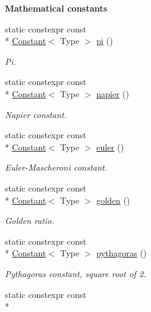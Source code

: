 \begin{Indent}{\bf Mathematical constants}\par
\begin{DoxyCompactItemize}
\item 
static constexpr const \\*
\hyperlink{exceptionmagrathea_1_1Constant}{Constant}$<$ Type $>$ \hyperlink{exceptionmagrathea_1_1Constants_a79171138d1fe0b3e70fedd56d464fdd6}{pi} ()
\begin{DoxyCompactList}\small\item\em Pi. \end{DoxyCompactList}\item 
static constexpr const \\*
\hyperlink{exceptionmagrathea_1_1Constant}{Constant}$<$ Type $>$ \hyperlink{exceptionmagrathea_1_1Constants_a54534097495fc563b9f8627dfc9020c8}{napier} ()
\begin{DoxyCompactList}\small\item\em Napier constant. \end{DoxyCompactList}\item 
static constexpr const \\*
\hyperlink{exceptionmagrathea_1_1Constant}{Constant}$<$ Type $>$ \hyperlink{exceptionmagrathea_1_1Constants_a9f9734b514d0fca8aa5c4bd4c1f5c98a}{euler} ()
\begin{DoxyCompactList}\small\item\em Euler-\/\-Mascheroni constant. \end{DoxyCompactList}\item 
static constexpr const \\*
\hyperlink{exceptionmagrathea_1_1Constant}{Constant}$<$ Type $>$ \hyperlink{exceptionmagrathea_1_1Constants_aff8c9ebdef8d923a9b4130fdf1c8a604}{golden} ()
\begin{DoxyCompactList}\small\item\em Golden ratio. \end{DoxyCompactList}\item 
static constexpr const \\*
\hyperlink{exceptionmagrathea_1_1Constant}{Constant}$<$ Type $>$ \hyperlink{exceptionmagrathea_1_1Constants_a2ce656e3e2685d54ce45a08cbadbbbea}{pythagoras} ()
\begin{DoxyCompactList}\small\item\em Pythagoras constant, square root of 2. \end{DoxyCompactList}\item 
static constexpr const \\*

\end{DoxyCompactItemize}
\end{Indent}
